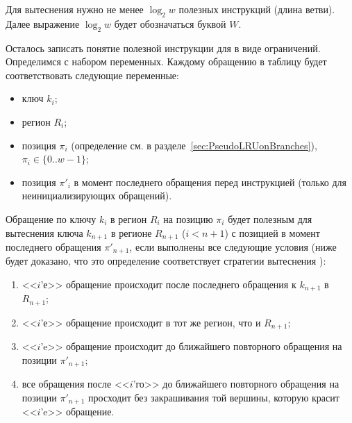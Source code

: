 Для вытеснения нужно не менее $\log_2 w$ полезных инструкций (длина ветви).
Далее выражение $\log_2 w$ будет обозначаться буквой $W$.

%
%
%

Осталось записать понятие полезной инструкции для \PseudoLRU в виде
ограничений. Определимся с набором переменных. Каждому обращению в таблицу будет соответствовать следующие переменные:
\begin{itemize}
  \item ключ $k_i$;
  \item регион $R_i$;
  \item позиция $\pi_i$ (определение см. в разделе~\ref{sec:PseudoLRUonBranches}), $\pi_i \in \{0..w{-}1\}$;
  \item позиция $\pi'_i$ в момент последнего обращения перед инструкцией (только для неинициализирующих обращений).
\end{itemize}

Обращение по ключу $k_i$ в регион $R_i$ на позицию $\pi_i$ будет полезным для вытеснения ключа $k_{n+1}$ в регионе $R_{n+1}$ ($i < n+1$) с позицией в момент последнего обращения $\pi'_{n+1}$, если выполнены все следующие условия (ниже будет доказано, что это определение соответствует стратегии вытеснения \PseudoLRU):
\begin{enumerate}
  \item <<$i$'е>> обращение происходит после последнего обращения к $k_{n+1}$ в $R_{n+1}$;
  \item <<$i$'е>> обращение происходит в тот же регион, что и $R_{n+1}$;
  \item <<$i$'e>> обращение происходит до ближайшего повторного обращения на позиции $\pi'_{n+1}$;
  \item все обращения после <<$i$'го>> до ближайшего повторного обращения на позиции $\pi'_{n+1}$ просходит без закрашивания той вершины, которую красит <<$i$'e>> обращение.
\end{enumerate}

